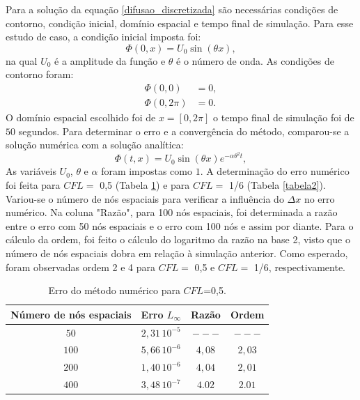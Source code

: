 \documentclass[10pt,twoside,a4paper]{article}
\begin{document}
Para a solução da equação \ref{difusao_discretizada} são necessárias condições de contorno, condição inicial, domínio espacial e tempo final de simulação. Para esse estudo de caso, a condição inicial imposta foi:
\begin{equation} \label{condicao_inicial}
\Phi(0,x)=U_0 \sin\left(\theta x\right), %
\end{equation}
na qual $U_0$ é a amplitude da função e $\theta$ é o número de onda. As condições de contorno foram:
\begin{equation} \label{condicoes_contorno}
\begin{split}
\Phi(0,0)&=0,\\
\Phi(0,2\pi)&=0.
\end{split}
\end{equation}
O domínio espacial escolhido foi de $x=[0,2\pi]$ o tempo final de simulação foi de $50$ segundos.
Para determinar o erro e a convergência do método, comparou-se a solução numérica com a solução analítica:
\begin{equation} \label{solucao_analitica}
\Phi(t,x)=U_0 \sin\left(\theta x\right) e^{-\alpha \theta^2 t},
\end{equation}
As variáveis $U_0$, $\theta$ e $\alpha$ foram impostas como $1$. A determinação do erro numérico foi feita para $CFL=$ 0,5 (Tabela \ref{tabela1}) e para $CFL=$ 1/6 (Tabela \ref{tabela2}). Variou-se o número de nós espaciais para verificar a influência do $\Delta x$ no erro numérico. Na coluna "Razão", para 100 nós espaciais, foi determinada a razão entre o erro com 50 nós espaciais e o erro com 100 nós e assim por diante. Para o cálculo da ordem, foi feito o cálculo do logaritmo da razão na base 2, visto que o número de nós espaciais dobra em relação à simulação anterior. Como esperado, foram observadas ordem 2 e 4 para $CFL=$ 0,5 e $CFL=$ 1/6, respectivamente.

\begin{table}[h!]
\caption{Erro do método numérico para $CFL$=0,5.}
\label{tabela1}
\centering
\begin{tabular}{cccc}
\hline
Número de nós  espaciais&        Erro $L_\infty$       & Razão      & Ordem    \\ \hline
$50$ &       $2,31 \, 10^{-5}$        & $---$      & $---$    \\ 
$100$ &       $5,66 \, 10^{-6}$        & $4,08$      & $2,03$    \\ 
$200$ &       $1,40 \, 10^{-6}$        & $4,04$      & $2,01$    \\ 
$400$ &       $3,48 \, 10^{-7}$        & $4.02$      & $2.01$    \\ \hline
\end{tabular}
\end{table}
\end{document}
